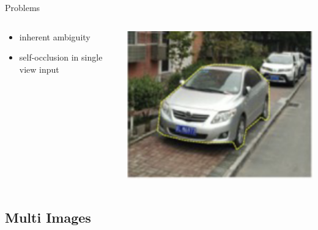 \documentclass[dark]{sintefbeamer}
\begin{document}
\begin{frame}[fragile]{Problems}

\begin{columns}
  \begin{column}{0.5\textwidth}
    \begin{itemize}
      \item inherent ambiguity
      \item self-occlusion in single view input
    \end{itemize}

  \end{column}
  \begin{column}{0.5\textwidth}
    \includegraphics[width=\textwidth]{images/截屏2024-01-28 21.49.33.png}
  \end{column}
\end{columns}

\end{frame}

\subsection{Multi Images}
\end{document}

